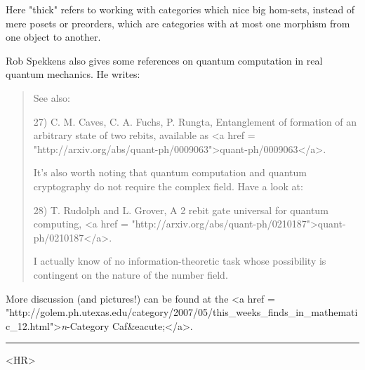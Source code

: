 Here "thick" refers to working with categories which nice
big hom-sets, instead of mere posets or preorders, which are categories 
with at most one morphism from one object to another.

Rob Spekkens also gives some references on quantum computation
in real quantum mechanics.  He writes:

\begin{quote}
See also:

27) C. M. Caves, C. A. Fuchs, P. Rungta, Entanglement of formation of an
arbitrary state of two rebits, available as <a href = "http://arxiv.org/abs/quant-ph/0009063">quant-ph/0009063</a>.

It's also worth noting that quantum computation and quantum cryptography do
not require the complex field.  Have a look at:

28) T. Rudolph and L. Grover, A 2 rebit gate universal for quantum
computing, 
<a href = "http://arxiv.org/abs/quant-ph/0210187">quant-ph/0210187</a>.

I actually know of no information-theoretic task whose possibility is
contingent on the nature of the number field.
\end{quote}
    

More discussion (and pictures!) can be found at the <a href = "http://golem.ph.utexas.edu/category/2007/05/this_weeks_finds_in_mathematic_12.html">\emph{n}-Category
Caf&eacute;</a>.

\par\noindent\rule{\textwidth}{0.4pt}
<HR>



